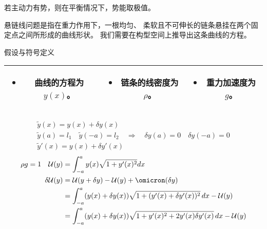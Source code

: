 \documentclass[12pt, a4paper, oneside, UTF8]{ctexbook}  %
\begin{document}
\begin{thm}
    若主动力有势，则在平衡情况下，势能取极值。
\end{thm}
\begin{example}
    悬链线问题是指在重力作用下，一根均匀、
    柔软且不可伸长的链条悬挂在两个固定点之间所形成的曲线形状。
    我们需要在构型空间上推导出这条曲线的方程。

    假设与符号定义

    \noindent
    \begin{tabular}{|c|c|c|}
        \hline
        \begin{minipage}{0.3\linewidth}
            \begin{itemize}
              \item 曲线的方程为 \( y(x) \)。
            \end{itemize}
          \end{minipage} &
        \begin{minipage}{0.3\linewidth}
          \begin{itemize}
            \item 链条的线密度为 \( \rho \)。
          \end{itemize}
        \end{minipage} &
        \begin{minipage}{0.3\linewidth}
          \begin{itemize}
            \item 重力加速度为 \( g \)。
          \end{itemize}
        \end{minipage} 
        \\ \hline
      \end{tabular} 
    \begin{solution}
        \begin{gather*}
            \tilde{y}(x)=y(x)+\delta y(x)\\
\tilde{y}(a)=l_{1}\quad\tilde{y}(-a)=l_{2}\quad\Rightarrow\quad\delta y(a)=0\quad\delta y(-a)=0
\\\tilde{y}'(x)=y(x)+\delta y'(x)
        \end{gather*}
\begin{align*}
    \rho g =1\quad
\mathcal{U}(y)&=\int_{-a}^{a}y(x)\sqrt{1+y^{\prime}(x)^{2}}dx\\
\delta \mathcal{U}(y)&=\mathcal{U}(y+\delta y)-\mathcal{U}(y)+\omicron(\delta y)\\
&=\int_{-a}^{a}(y(x)+\delta y (x))\sqrt{1+(y'(x)+ \delta y'(x))^{2}}\,dx-\mathcal{U}(y)
\\&=\int_{-a}^{a}(y(x)+\delta y (x))\sqrt{1+y'(x)^{2}+2y'(x) \delta y'(x)}\,dx-\mathcal{U}(y)

\end{align*}
\end{solution}
\end{example}
\end{document}
